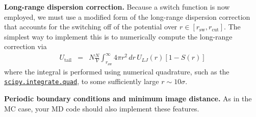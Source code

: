 \documentclass[aip,jcp,preprint,superscriptaddress,floatfix]{revtex4-1}
\begin{document}
\textbf{Long-range dispersion correction.}
Because a switch function is now employed, we must use a modified form of the long-range dispersion correction that accounts for the switching off of the potential over $r \in [r_\mathrm{sw}, r_\mathrm{cut}]$.
The simplest way to implement this is to numerically compute the long-range correction via
\begin{eqnarray}
U_\mathrm{tail} &=& N \frac{N}{V} \int_{r_\mathrm{sw}}^\infty 4 \pi r^2 \, dr \, U_{LJ}(r) [1 - S(r)] 
\end{eqnarray}
where the integral is performed using numerical quadrature, such as the \href{https://docs.scipy.org/doc/scipy/reference/generated/scipy.integrate.quad.html}{\tt scipy.integrate.quad}, to some sufficiently large $r \sim 10 \sigma$.

\textbf{Periodic boundary conditions and minimum image distance.} 
As in the MC case, your MD code should also implement these features.

\newpage
%


\end{document}
